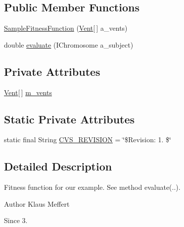 \subsection*{Public Member Functions}
\begin{DoxyCompactItemize}
\item 
\hyperlink{classexamples_1_1equal_distribution_1_1_sample_fitness_function_afe451285b1576bc237f83489f118d668}{Sample\-Fitness\-Function} (\hyperlink{classexamples_1_1equal_distribution_1_1_vent}{Vent}\mbox{[}$\,$\mbox{]} a\-\_\-vents)
\item 
double \hyperlink{classexamples_1_1equal_distribution_1_1_sample_fitness_function_af496d9cd748f7217c84c2adb7632baaa}{evaluate} (I\-Chromosome a\-\_\-subject)
\end{DoxyCompactItemize}
\subsection*{Private Attributes}
\begin{DoxyCompactItemize}
\item 
\hyperlink{classexamples_1_1equal_distribution_1_1_vent}{Vent}\mbox{[}$\,$\mbox{]} \hyperlink{classexamples_1_1equal_distribution_1_1_sample_fitness_function_a9f0c69bc2c9a8a5363e6247cf391d7b8}{m\-\_\-vents}
\end{DoxyCompactItemize}
\subsection*{Static Private Attributes}
\begin{DoxyCompactItemize}
\item 
static final String \hyperlink{classexamples_1_1equal_distribution_1_1_sample_fitness_function_a151822990a94c71c79c3d372592e4afa}{C\-V\-S\-\_\-\-R\-E\-V\-I\-S\-I\-O\-N} = \char`\"{}\$Revision\-: 1. \$\char`\"{}
\end{DoxyCompactItemize}


\subsection{Detailed Description}
Fitness function for our example. See method evaluate(..).

\begin{DoxyAuthor}{Author}
Klaus Meffert 
\end{DoxyAuthor}
\begin{DoxySince}{Since}
3. 
\end{DoxySince}


